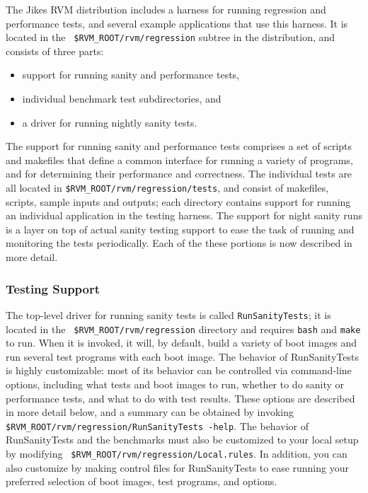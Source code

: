  The Jikes\TMweb{} RVM distribution includes a harness for running
regression and performance tests, and several example applications
that use this harness.  It is located in the {\tt
\$RVM\_\-ROOT/rvm/regression} subtree in the distribution, and consists
of three parts:
\begin{itemize}
\item support for running sanity and performance tests, 
\item individual benchmark test subdirectories, and 
\item a driver for running nightly sanity tests.  
\end{itemize}
The support for running
sanity and performance tests comprises a set of scripts and makefiles
that define a common interface for running a variety of programs, and
for determining their performance and correctness.  The individual
tests are all located in {\tt{\$RVM\_\-ROOT/rvm/regression/tests}}, and
consist of makefiles, scripts, sample inputs and outputs; each
directory contains support for running an individual application in
the testing harness.  The support for night sanity runs is a layer on
top of actual sanity testing support to ease the task of running and
monitoring the tests periodically.  Each of the these portions is now
described in more detail.

\subsubsection{Testing Support}

The top-level driver for running sanity tests is called
{\tt{RunSanityTests}}; it is located in the {\tt
\$RVM\_\-ROOT/rvm/regression} directory 
and requires {\tt{bash}} and {{\tt make}} to run.  When it
is invoked, it will, by default, build a variety of boot images and
run several test programs with each boot image.  The behavior of
RunSanityTests is highly customizable: most of its behavior can be
controlled via command-line options, including what tests and boot
images to run, whether to do sanity or performance tests, and what to
do with test results. These options are described in more detail
below, and a summary can be obtained by invoking {\tt
\$RVM\_\-ROOT/rvm/regression/RunSanityTests -help}.  The behavior of
RunSanityTests and the benchmarks must also be customized to your
local setup by modifying {\tt
\$RVM\_\-ROOT/rvm/regression/Local.rules}.  In addition, you can also
customize by making control files for RunSanityTests to ease running
your preferred selection of boot images, test programs, and options.

